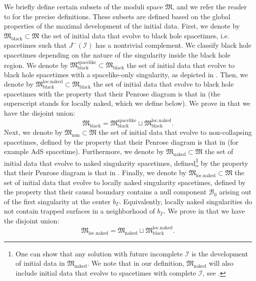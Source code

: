 \documentclass[11pt]{article}
\numberwithin{equation}{section}
\begin{document}
We briefly define certain subsets of the moduli space $\mathfrak{M}$, and we refer the reader to  for the precise definitions. These subsets are defined based on the global properties of the maximal development of the initial data. First, we denote by $\mathfrak{M}_{\mathrm{black}}\subset\mathfrak{M}$ the set of initial data that evolve to black hole spacetimes, i.e. spacetimes such that $J^-(\mathcal{I})$ has a nontrivial complement. We classify black hole spacetimes depending on the nature of the singularity inside the black hole region. We denote by $\mathfrak{M}_{\mathrm{black}}^{\mathrm{spacelike}}\subset\mathfrak{M}_{\mathrm{black}}$ the set of initial data that evolve to black hole spacetimes with a spacelike-only singularity, as depicted in . Then, we denote by $\mathfrak{M}_{\mathrm{black}}^{\mathrm{loc.naked}}\subset\mathfrak{M}_{\mathrm{black}}$ the set of initial data that evolve to black hole spacetimes with the property that their Penrose diagram is that in  (the superscript stands for locally naked, which we define below). We prove in  that we have the disjoint union: 
\begin{equation}
    \mathfrak{M}_{\mathrm{black}}=\mathfrak{M}_{\mathrm{black}}^{\mathrm{spacelike}}\sqcup\mathfrak{M}_{\mathrm{black}}^{\mathrm{loc.naked}}.
\end{equation}
Next, we denote by $\mathfrak{M}_{\mathrm{non}}\subset\mathfrak{M}$ the set of initial data that evolve to non-collapsing spacetimes, defined by the property that their Penrose diagram is that in  (for example AdS spacetime). Furthermore, we denote by $\mathfrak{M}_{\mathrm{naked}}\subset\mathfrak{M}$ the set of  initial data that evolve to naked singularity spacetimes, defined\footnote{One can show that any solution with future incomplete $\mathcal{I}$ is the development of initial data in $\mathfrak{M}_{\mathrm{naked}}.$ We note that in our definition, $\mathfrak{M}_{\mathrm{naked}}$ will also include initial data that evolve to spacetimes with complete $\mathcal{I}$, see .} by the property that their Penrose diagram is that in . Finally, we denote by $\mathfrak{M}_{\mathrm{loc.naked}}\subset\mathfrak{M}$ the set of  initial data that evolve to locally naked singularity spacetimes, defined by the property that their causal boundary contains a null component $\mathcal{B}_0$ arising out of the first singularity at the center $b_{\Gamma}$. Equivalently, locally naked singularities do not contain trapped surfaces in a neighborhood of $b_{\Gamma}$. We prove in  that we have the disjoint union: 
\begin{equation}
    \mathfrak{M}_{\mathrm{loc.naked}}=\mathfrak{M}_{\mathrm{naked}}\sqcup\mathfrak{M}_{\mathrm{black}}^{\mathrm{loc.naked}}.
\end{equation}
\end{document}

